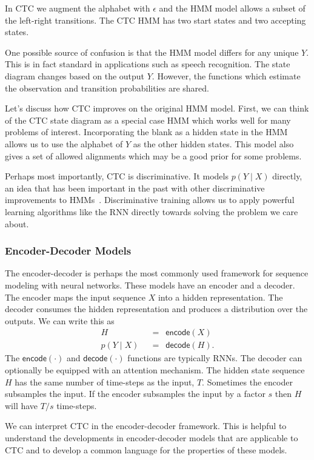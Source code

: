 In CTC we augment the alphabet with $\epsilon$ and the HMM model allows a
subset of the left-right transitions. The CTC HMM has two start states and two
accepting states.

One possible source of confusion is that the HMM model differs for any unique
$Y$. This is in fact standard in applications such as speech recognition. The
state diagram changes based on the output $Y$. However, the functions which
estimate the observation and transition probabilities are shared.

Let's discuss how CTC improves on the original HMM model. First, we can think
of the CTC state diagram as a special case HMM which works well for many
problems of interest. Incorporating the blank as a hidden state in the HMM
allows us to use the alphabet of $Y$ as the other hidden states. This model
also gives a set of allowed alignments which may be a good prior for some
problems.

Perhaps most importantly, CTC is discriminative. It models $p(Y \mid X)$
directly, an idea that has been important in the past with other discriminative
improvements to HMMs~\cite{woodland2002}.  Discriminative training allows us to
apply powerful learning algorithms like the RNN directly towards solving the
problem we care about.

\subsubsection{Encoder-Decoder Models}

The encoder-decoder is perhaps the most commonly used framework for sequence
modeling with neural networks. These models have an encoder and a decoder. The
encoder maps the input sequence $X$ into a hidden representation. The decoder
consumes the hidden representation and produces a distribution over the
outputs. We can write this as
\begin{align*}
H\enspace &= \enspace\textsf{encode}(X) \\[.5em]
p(Y \mid X)\enspace &= \enspace \textsf{decode}(H).
\end{align*}
The $\textsf{encode}(\cdot)$ and $\textsf{decode}(\cdot)$ functions are
typically RNNs. The decoder can optionally be equipped with an attention
mechanism. The hidden state sequence $H$ has the same number of time-steps as
the input, $T$. Sometimes the encoder subsamples the input. If the encoder
subsamples the input by a factor $s$ then $H$ will have $T/s$ time-steps.

We can interpret CTC in the encoder-decoder framework. This is helpful to
understand the developments in encoder-decoder models that are applicable to
CTC and to develop a common language for the properties of these models.

